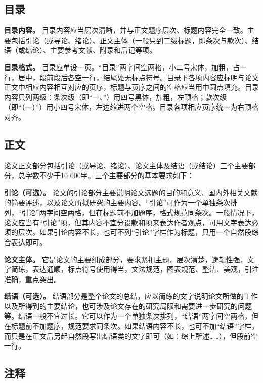 \documentclass[singlesided]{Style/ucasthesis}%
\begin{document}
\hypertarget{section-17}{%
\subsection{目录}\label{section-17}}

\textbf{目录内容。} 目录内容应当层次清晰，并与正文题序层次、标题内容完全一致。主要包括引论（或导论、绪论）、正文主体（一般只到二级标题，即条次与款次）、结语（或结论）、主要参考文献、附录和后记等项。

\textbf{目录格式。} 目录应单设一页。``目录''两字间空两格，小二号宋体，加粗，占一行，居中，段前段后各空一行，结尾处无标点符号。目录下各项内容应标明与论文正文中相应内容相互对应的页序，标题与页序之间的空格应当用中圆点填充。目录内容只列两级：条次级（即``一、''）用四号黑体，加粗，左顶格；款次级（即``（一）''）用小四号宋体，左边缩进两个空格。目录各项相应页序统一为右顶格对齐。

\hypertarget{section-18}{%
\subsection{正文}\label{section-18}}

论文正文部分包括引论（或导论、绪论）、论文主体及结语（或结论）三个主要部分，总字数不少于10 000字。三个主要部分的基本要求如下：

\textbf{引论（可选）。} 论文的引论部分主要说明论文选题的目的和意义、国内外相关文献的简要评述，以及论文所拟研究的主要内容。``引论''可作为一个单独条次排列，``引论''两字间空两格，但在标题前不加题序，格式规范同条次。一般情况下，论文应当有``引论''项，但其内容不宜分设款和项来表达作者观点，可用文字表达必须的层次。如果引论内容不长，也可不列``引论''字样作为标题，只用一个自然段综合表达即可。

\textbf{论文主体。} 它是论文的主要组成部分，要求紧扣主题，层次清楚，逻辑性强，文字简练，表达通顺，标点符号使用得当，文法规范，图表规范、整洁、美观，引注准确，重点突出。

\textbf{结语（可选）。} 结语部分是整个论文的总结，应以简练的文字说明论文所做的工作以及所得到的主要结论，也可涉及论文存在的研究局限和需要进一步研究的问题等。结语一般不宜过长。它可以作为一个单独条次排列，``结语''两字间空两格，但在标题前不加题序，规范要求同条次。如果结语内容不长，也可不加``结语''字样，而只是在正文后另起自然段写出结语类的文字即可（如：综上所述\ldots{}\ldots{}），但段前空一行。

\hypertarget{section-19}{%
\subsection{注释}\label{section-19}}
\end{document}
